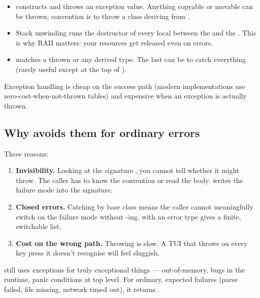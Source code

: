 \begin{itemize}[leftmargin=*]
  \item {} constructs and throws an exception value.
    Anything copyable or movable can be thrown; convention is to
    throw a class deriving from .
  \item Stack unwinding runs the destructor of every local between
    the  and the . This is why RAII
    matters: your resources get released even on errors.
  \item {} matches a thrown  or any
    derived type. The last  can be 
    to catch everything (rarely useful except at the top of
    ).
\end{itemize}

Exception handling is cheap on the success path (modern
implementations use zero-cost-when-not-thrown tables) and expensive
when an exception is actually thrown.

\subsection{Why \maya{} avoids them for ordinary errors}

Three reasons:

\begin{enumerate}[leftmargin=*]
  \item \textbf{Invisibility.} Looking at the signature
    , you cannot tell whether
    it might throw. The caller has to know the convention or read
    the body.  writes the
    failure mode into the signature.
  \item \textbf{Closed errors.} Catching by base class means the
    caller cannot meaningfully switch on the failure mode without
    -ing.  with an
     error type gives a finite, switchable
    list.
  \item \textbf{Cost on the wrong path.} Throwing is slow. A TUI
    that throws on every key press it doesn't recognise will feel
    sluggish.
\end{enumerate}

\maya{} still uses exceptions for truly exceptional things ---
out-of-memory, bugs in the runtime, panic conditions at top level.
For ordinary, expected failures (parse failed, file missing,
network timed out), it returns .

